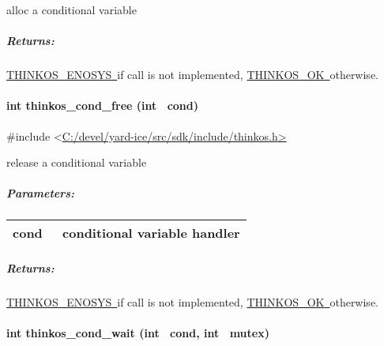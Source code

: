 {{alloc a conditional variable }

{}

\subparagraph{\texorpdfstring{{Returns:}}{Returns:}}\label{returns-17}

{\protect\hyperlink{h.3s49zyc}{THINKOS\_ENOSYS}}{\protect\hyperlink{h.3s49zyc}{~}}{if
call is not implemented,
}{\protect\hyperlink{h.2fk6b3p}{THINKOS\_OK}}{\protect\hyperlink{h.2fk6b3p}{~}}{otherwise.
}

\paragraph{\texorpdfstring{{int thinkos\_cond\_free (int
~cond)}}{int thinkos\_cond\_free (int ~cond)}}\label{int-thinkos_cond_free-int-cond}

{}

{\#include
\textless{}}{\protect\hyperlink{h.pkwqa1}{C:/devel/yard-ice/src/sdk/include/thinkos.h}}{\protect\hyperlink{h.pkwqa1}{\textgreater{}}}

{release a conditional variable }

{}

\subparagraph{\texorpdfstring{{Parameters:}}{Parameters:}}\label{parameters-14}

\protect\hypertarget{t.5f6a6301995a69995f1253a58a8df876856672ec}{}{}\protect\hypertarget{t.14}{}{}

\begin{longtable}[]{@{}ll@{}}
\toprule
\begin{minipage}[t]{0.47\columnwidth}\raggedright\strut
{cond}{~}\strut
\end{minipage} & \begin{minipage}[t]{0.47\columnwidth}\raggedright\strut
{conditional variable handler }\strut
\end{minipage}\tabularnewline
\bottomrule
\end{longtable}

\subparagraph{\texorpdfstring{{Returns:}}{Returns:}}\label{returns-18}

{\protect\hyperlink{h.3s49zyc}{THINKOS\_ENOSYS}}{\protect\hyperlink{h.3s49zyc}{~}}{if
call is not implemented,
}{\protect\hyperlink{h.2fk6b3p}{THINKOS\_OK}}{\protect\hyperlink{h.2fk6b3p}{~}}{otherwise.
}

\paragraph{\texorpdfstring{{int thinkos\_cond\_wait (int ~cond, int
~mutex)}}{int thinkos\_cond\_wait (int ~cond, int ~mutex)}}\label{int-thinkos_cond_wait-int-cond-int-mutex}

}
